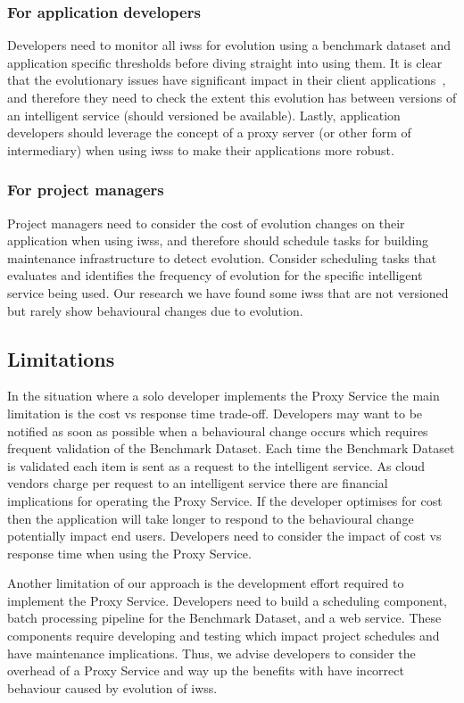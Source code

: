 \subsubsection{For application developers} Developers need to monitor all \glspl{iws} for evolution using a benchmark dataset and application specific thresholds before diving straight into using them. It is clear that the evolutionary issues have significant impact in their client applications~\citep{Cummaudo:2019icsme}, and therefore they need to check the extent this evolution has  between versions of an intelligent service (should versioned  be available). Lastly, application developers should leverage the concept of a proxy server (or other form of intermediary) when using \glspl{iws} to make their applications more robust.

\subsubsection{For project managers} Project managers need to consider the cost of evolution changes on their application when using \glspl{iws}, and therefore should schedule tasks for building maintenance infrastructure to detect evolution. 
Consider scheduling tasks that evaluates and identifies the frequency of evolution for the specific intelligent service being used. Our research we have found some \glspl{iws} that are not versioned but rarely show behavioural changes due to evolution.

\subsection{Limitations}

In the situation where a solo developer implements the Proxy Service the main limitation is the cost vs response time trade-off. Developers may want to be notified as soon as possible when a behavioural change occurs which requires frequent validation of the Benchmark Dataset. Each time the Benchmark Dataset is validated each item is sent as a request to the intelligent service. As cloud vendors charge per request to an intelligent service there are financial implications for operating the Proxy Service. If the developer optimises for cost then the application will take longer to respond to the behavioural change potentially impact end users. Developers need to consider the impact of cost vs response time when using the Proxy Service. 

Another limitation of our approach is the development effort required to implement the Proxy Service. Developers need to build a scheduling component, batch processing pipeline for the Benchmark Dataset, and a web service. These components require developing and testing which impact project schedules and have maintenance implications. Thus, we advise developers to consider the overhead of a Proxy Service and way up the benefits with have incorrect behaviour caused by evolution of \glspl{iws}. 

